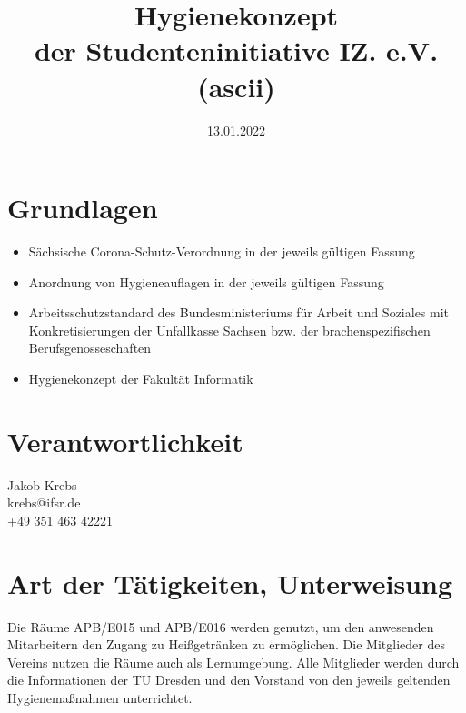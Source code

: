 \documentclass[12pt]{article}
\title{Hygienekonzept\\der Studenteninitiative IZ. e.V. (ascii)}
\date{13.01.2022}
\author{}
\makeatletter
\newcommand*{\responsibleName}{Jakob Krebs}
\newcommand*{\responsibleMail}{krebs@ifsr.de}
\newcommand*{\responsiblePhone}{+49 351 463 42221}
\makeatother
\begin{document}
    \maketitle

    \section*{Grundlagen}

        \begin{itemize}
            \item Sächsische Corona-Schutz-Verordnung in der jeweils gültigen Fassung
            \item Anordnung von Hygieneauflagen in der jeweils gültigen Fassung
            \item Arbeitsschutzstandard des Bundesministeriums für Arbeit und Soziales mit Konkretisierungen der Unfallkasse Sachsen bzw. der brachenspezifischen Berufsgenosseschaften
            \item Hygienekonzept der Fakultät Informatik
        \end{itemize}

    \section*{Verantwortlichkeit}
        \responsibleName \\
        \responsibleMail \\
        \responsiblePhone

    \section{Art der Tätigkeiten, Unterweisung}
        Die Räume APB/E015 und APB/E016 werden genutzt, um den anwesenden Mitarbeitern den Zugang zu Heißgetränken zu ermöglichen.
        Die Mitglieder des Vereins nutzen die Räume auch als Lernumgebung.
        Alle Mitglieder werden durch die Informationen der TU Dresden und den Vorstand von den jeweils geltenden Hygienemaßnahmen unterrichtet.
\end{document}
